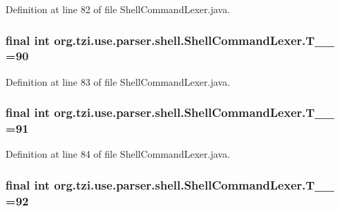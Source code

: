 Definition at line 82 of file Shell\-Command\-Lexer.\-java.

\hypertarget{classorg_1_1tzi_1_1use_1_1parser_1_1shell_1_1_shell_command_lexer_a1a4d35aa87901f0fad5c408c812936f6}{
\subsubsection[{T\-\_\-\-\_\-90}]{\setlength{\rightskip}{0pt plus 5cm}final int org.\-tzi.\-use.\-parser.\-shell.\-Shell\-Command\-Lexer.\-T\-\_\-\-\_ =90\hspace{0.3cm}{\ttfamily [static]}}}\label{classorg_1_1tzi_1_1use_1_1parser_1_1shell_1_1_shell_command_lexer_a1a4d35aa87901f0fad5c408c812936f6}


Definition at line 83 of file Shell\-Command\-Lexer.\-java.

\hypertarget{classorg_1_1tzi_1_1use_1_1parser_1_1shell_1_1_shell_command_lexer_ac56d5fa02587eaf53b7dd7d42bfc2233}{
\subsubsection[{T\-\_\-\-\_\-91}]{\setlength{\rightskip}{0pt plus 5cm}final int org.\-tzi.\-use.\-parser.\-shell.\-Shell\-Command\-Lexer.\-T\-\_\-\-\_ =91\hspace{0.3cm}{\ttfamily [static]}}}\label{classorg_1_1tzi_1_1use_1_1parser_1_1shell_1_1_shell_command_lexer_ac56d5fa02587eaf53b7dd7d42bfc2233}


Definition at line 84 of file Shell\-Command\-Lexer.\-java.

\hypertarget{classorg_1_1tzi_1_1use_1_1parser_1_1shell_1_1_shell_command_lexer_ac5354cba6addaed7ca1c08535f0a1f52}{
\subsubsection[{T\-\_\-\-\_\-92}]{\setlength{\rightskip}{0pt plus 5cm}final int org.\-tzi.\-use.\-parser.\-shell.\-Shell\-Command\-Lexer.\-T\-\_\-\-\_ =92\hspace{0.3cm}{\ttfamily [static]}}}\label{classorg_1_1tzi_1_1use_1_1parser_1_1shell_1_1_shell_command_lexer_ac5354cba6addaed7ca1c08535f0a1f52}


